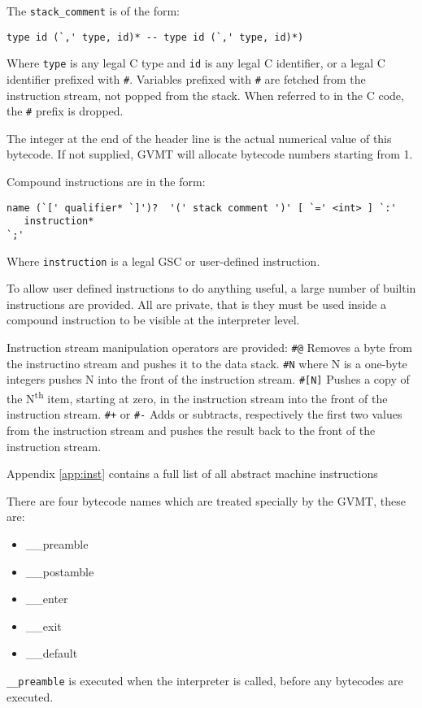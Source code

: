 The \verb|stack_comment| is of the form:
 \begin{verbatim}
type id (`,' type, id)* -- type id (`,' type, id)*)
\end{verbatim}

Where \verb|type| is any legal C type and \verb|id| is any legal C identifier, or a legal C identifier prefixed with \verb|#|. Variables prefixed with \verb|#| are fetched from the instruction stream, not popped from the stack. When referred to in the C code, the \verb|#| prefix is dropped.

The integer at the end of the header line is the actual numerical value of this bytecode. If not supplied, GVMT will allocate bytecode numbers starting from 1.

Compound instructions are in the form:
\begin{verbatim}
name (`[' qualifier* `]')?  '(' stack comment ')' [ `=' <int> ] `:'
   instruction*
`;'
\end{verbatim}

Where \verb|instruction| is a legal GSC or user-defined instruction.

To allow user defined instructions to do anything useful, a large number of builtin instructions are provided. All are private, that is they must be used inside a compound instruction to be visible at the interpreter level. 

Instruction stream manipulation operators are provided:
\verb|#@| Removes a byte from the instructino stream and pushes it to the data stack.
\verb|#N| where N is a one-byte integers pushes N into the front of the instruction stream.
\verb|#[N]| Pushes a copy of the N\textsuperscript{th} item, starting at zero, in the instruction stream into the front of the instruction stream.
\verb|#+| or \verb|#-| Adds or subtracts, respectively the first two values from the instruction stream  and pushes the result back to the front of the instruction stream.

Appendix \ref{app:inst} contains a full list of all abstract machine instructions 

There are four bytecode names which are treated specially by the GVMT, these are:
\begin{itemize}
\item \_\_preamble 
\item \_\_postamble
\item \_\_enter
\item \_\_exit
\item \_\_default
\end{itemize}
\verb|__preamble| is executed when the interpreter is called, before any bytecodes are executed.

